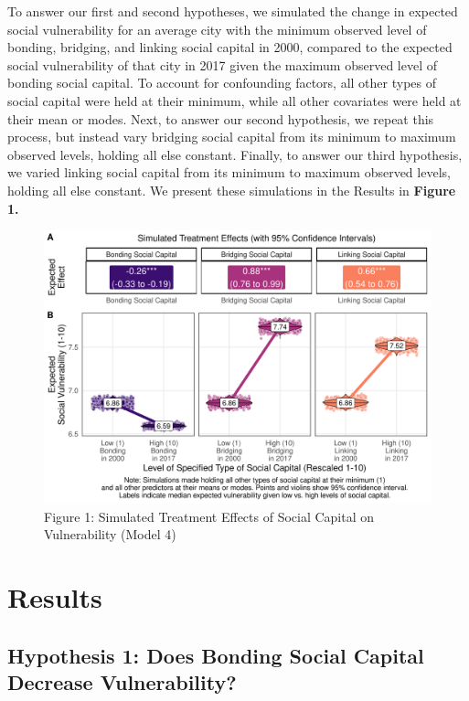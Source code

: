 \documentclass[]{elsarticle} %
\newcommand{\blandscape}{\begin{landscape}}
\newcommand{\elandscape}{\end{landscape}}
\begin{document}
To answer our first and second hypotheses, we simulated the change in
expected social vulnerability for an average city with the minimum
observed level of bonding, bridging, and linking social capital in 2000,
compared to the expected social vulnerability of that city in 2017 given
the maximum observed level of bonding social capital. To account for
confounding factors, all other types of social capital were held at
their minimum, while all other covariates were held at their mean or
modes. Next, to answer our second hypothesis, we repeat this process,
but instead vary bridging social capital from its minimum to maximum
observed levels, holding all else constant. Finally, to answer our third
hypothesis, we varied linking social capital from its minimum to maximum
observed levels, holding all else constant. We present these simulations
in the Results in \textbf{Figure 1.}

\newpage
\blandscape
\begin{figure}
\includegraphics[width=1\linewidth]{did_fd} \caption{Figure 1: Simulated Treatment Effects of Social Capital on Vulnerability (Model 4)}\label{fig:fig1}
\end{figure}
\elandscape
\newpage

\hypertarget{results}{%
\section{Results}\label{results}}

\hypertarget{hypothesis-1-does-bonding-social-capital-decrease-vulnerability}{%
\subsection{Hypothesis 1: Does Bonding Social Capital Decrease
Vulnerability?}\label{hypothesis-1-does-bonding-social-capital-decrease-vulnerability}}
\end{document}
